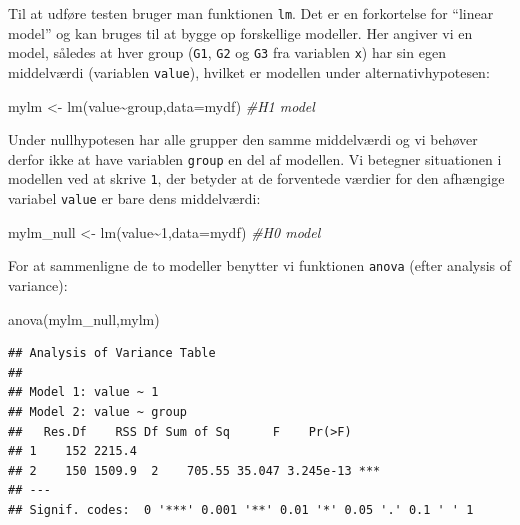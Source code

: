 \documentclass[
]{book}
\newenvironment{Shaded}{\begin{snugshade}}{\end{snugshade}}
\newcommand{\AttributeTok}[1]{\textcolor[rgb]{0.77,0.63,0.00}{#1}}
\newcommand{\CommentTok}[1]{\textcolor[rgb]{0.56,0.35,0.01}{\textit{#1}}}
\newcommand{\DecValTok}[1]{\textcolor[rgb]{0.00,0.00,0.81}{#1}}
\newcommand{\FunctionTok}[1]{\textcolor[rgb]{0.00,0.00,0.00}{#1}}
\newcommand{\NormalTok}[1]{#1}
\newcommand{\OtherTok}[1]{\textcolor[rgb]{0.56,0.35,0.01}{#1}}
\newcommand{\SpecialCharTok}[1]{\textcolor[rgb]{0.00,0.00,0.00}{#1}}
\begin{document}
Til at udføre testen bruger man funktionen \texttt{lm}. Det er en forkortelse for ``linear model'' og kan bruges til at bygge op forskellige modeller. Her angiver vi en model, således at hver group (\texttt{G1}, \texttt{G2} og \texttt{G3} fra variablen \texttt{x}) har sin egen middelværdi (variablen \texttt{value}), hvilket er modellen under alternativhypotesen:

\begin{Shaded}
\begin{Highlighting}[]
\NormalTok{mylm }\OtherTok{\textless{}{-}} \FunctionTok{lm}\NormalTok{(value}\SpecialCharTok{\textasciitilde{}}\NormalTok{group,}\AttributeTok{data=}\NormalTok{mydf) }\CommentTok{\#H1 model}
\end{Highlighting}
\end{Shaded}

Under nullhypotesen har alle grupper den samme middelværdi og vi behøver derfor ikke at have variablen \texttt{group} en del af modellen. Vi betegner situationen i modellen ved at skrive \texttt{1}, der betyder at de forventede værdier for den afhængige variabel \texttt{value} er bare dens middelværdi:

\begin{Shaded}
\begin{Highlighting}[]
\NormalTok{mylm\_null }\OtherTok{\textless{}{-}} \FunctionTok{lm}\NormalTok{(value}\SpecialCharTok{\textasciitilde{}}\DecValTok{1}\NormalTok{,}\AttributeTok{data=}\NormalTok{mydf) }\CommentTok{\#H0 model}
\end{Highlighting}
\end{Shaded}

For at sammenligne de to modeller benytter vi funktionen \texttt{anova} (efter analysis of variance):

\begin{Shaded}
\begin{Highlighting}[]
\FunctionTok{anova}\NormalTok{(mylm\_null,mylm)}
\end{Highlighting}
\end{Shaded}

\begin{verbatim}
## Analysis of Variance Table
## 
## Model 1: value ~ 1
## Model 2: value ~ group
##   Res.Df    RSS Df Sum of Sq      F    Pr(>F)    
## 1    152 2215.4                                  
## 2    150 1509.9  2    705.55 35.047 3.245e-13 ***
## ---
## Signif. codes:  0 '***' 0.001 '**' 0.01 '*' 0.05 '.' 0.1 ' ' 1
\end{verbatim}
\end{document}
